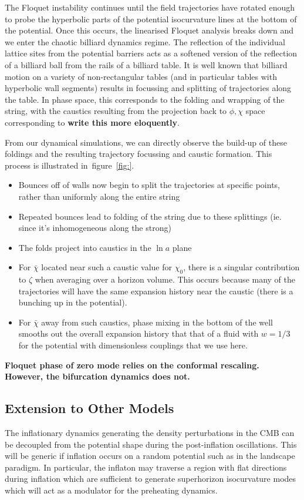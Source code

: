 \documentclass[11pt,a4paper]{article}
\newcommand{\figref}[1]{figure~\ref{#1}}
\begin{document}
The Floquet instability continues until the field trajectories have rotated enough to probe the hyperbolic parts of the potential isocurvature lines at the bottom of the potential.
Once this occurs, the linearised Floquet analysis breaks down and we enter the chaotic billiard dynamics regime.
The reflection of the individual lattice sites from the potential barriers acts as a softened version of the reflection of a billiard ball from the rails of a billiard table.
It is well known that billiard motion on a variety of non-rectangular tables (and in particular tables with hyperbolic wall segments) results in focussing and splitting of trajectories along the table.
In phase space, this corresponds to the folding and wrapping of the string, with the caustics resulting from the projection back to $\phi,\chi$ space corresponding to {\bf write this more eloquently}.

From our dynamical simulations, we can directly observe the build-up of these foldings and the resulting trajectory focussing and caustic formation.
This process is illustrated in~\figref{fig:}.

\begin{itemize}
\item Bounces off of walls now begin to split the trajectories at specific points, rather than uniformly along the entire string
\item Repeated bounces lead to folding of the string due to these splittings (ie. since it's inhomogeneous along the strong)
\item The folds project into caustics in the $\ln a$ plane
\item For $\bar{\chi}$ located near such a caustic value for $\chi_0$, there is a singular contribution to $\zeta$ when averaging over a horizon volume.  This occurs because many of the trajectories will have the same expansion history near the caustic (there is a bunching up in the potential).
\item For $\bar{\chi}$ away from such caustics, phase mixing in the bottom of the well smooths out the overall expansion history that that of a fluid with $w=1/3$ for the potential with dimensionless couplings that we use here.
\end{itemize}
{\bf Floquet phase of zero mode relies on the conformal rescaling.  However, the bifurcation dynamics does not.}

\subsection{Extension to Other Models}
The inflationary dynamics generating the density perturbations in the CMB can be decoupled from the potential shape during the post-inflation oscillations.
This will be generic if inflation occurs on a random potential such as in the landscape paradigm.
In particular, the inflaton may traverse a region with flat directions during inflation which are sufficient to generate superhorizon isocurvature modes which will act as a modulator for the preheating dynamics.
\end{document}
